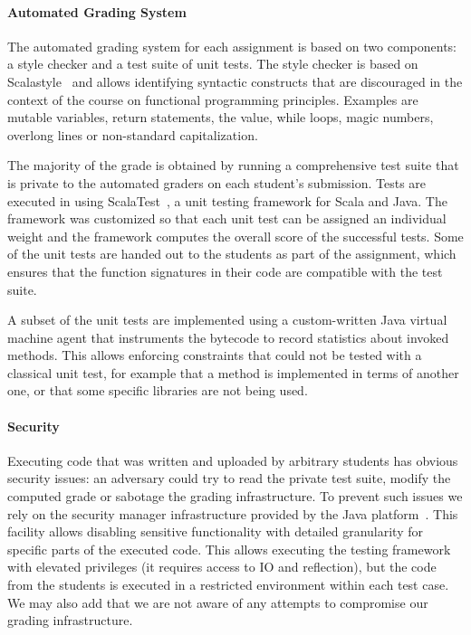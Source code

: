 \documentclass{sig-alternate}
\begin{document}
\paragraph{Automated Grading System}

The automated grading system for each assignment is based on two components: a
style checker and a test suite of unit tests. The style checker is based on
Scalastyle~\cite{ScalaStyle} and allows identifying syntactic constructs that
are discouraged in the context of the course on functional programming principles.
Examples are mutable variables, return statements, the \lstinline@null@ value,
while loops, magic numbers, overlong lines or non-standard capitalization.

The majority of the grade is obtained by running a comprehensive test suite
that is private to the automated graders on each student's submission.
Tests are executed in using ScalaTest~\cite{scalatest}, a unit testing framework
for Scala and Java. The framework was customized so that each unit test can be
assigned an individual weight and the framework computes the overall score of
the successful tests. Some of the unit tests are handed out to the students as
part of the assignment, which ensures that the function signatures in their code
are compatible with the test suite.

A subset of the unit tests are implemented using a custom-written Java virtual
machine agent \cite{vmagents} that instruments the bytecode to record statistics about
invoked methods. This allows enforcing constraints that could not be tested with a
classical unit test, for example that a method is implemented in terms of another
one, or that some specific libraries are not being used.

\paragraph{Security}

Executing code that was written and uploaded by arbitrary students has obvious
security issues: an adversary could try to read the private test suite, modify
the computed grade or sabotage the grading infrastructure. To prevent such issues
we rely on the security manager infrastructure provided by the Java platform~\cite{securityManager}.
This facility allows disabling sensitive functionality with detailed granularity
for specific parts of the executed code. This allows executing the testing framework
with elevated privileges (it requires access to IO and reflection), but the code
from the students is executed in a restricted environment within each test case.
We may also add that we are not aware of any attempts to compromise our grading
infrastructure.
\end{document}
